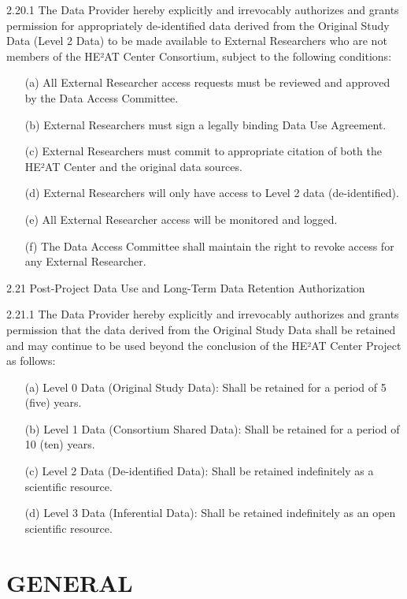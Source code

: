 \documentclass[12pt,letterpaper]{article}
\newcommand{\added}[1]{\textcolor{addcolor}{#1}}
\begin{document}
\added{2.20.1 The Data Provider hereby explicitly and irrevocably authorizes and grants permission for appropriately de-identified data derived from the Original Study Data (Level 2 Data) to be made available to External Researchers who are not members of the HE²AT Center Consortium, subject to the following conditions:
\begin{itemize}
\item[(a)] All External Researcher access requests must be reviewed and approved by the Data Access Committee.
\item[(b)] External Researchers must sign a legally binding Data Use Agreement.
\item[(c)] External Researchers must commit to appropriate citation of both the HE²AT Center and the original data sources.
\item[(d)] External Researchers will only have access to Level 2 data (de-identified).
\item[(e)] All External Researcher access will be monitored and logged.
\item[(f)] The Data Access Committee shall maintain the right to revoke access for any External Researcher.
\end{itemize}}

\added{2.21 Post-Project Data Use and Long-Term Data Retention Authorization}

\added{2.21.1 The Data Provider hereby explicitly and irrevocably authorizes and grants permission that the data derived from the Original Study Data shall be retained and may continue to be used beyond the conclusion of the HE²AT Center Project as follows:
\begin{itemize}
\item[(a)] Level 0 Data (Original Study Data): Shall be retained for a period of 5 (five) years.
\item[(b)] Level 1 Data (Consortium Shared Data): Shall be retained for a period of 10 (ten) years.
\item[(c)] Level 2 Data (De-identified Data): Shall be retained indefinitely as a scientific resource.
\item[(d)] Level 3 Data (Inferential Data): Shall be retained indefinitely as an open scientific resource.
\end{itemize}}

\section{GENERAL}
\end{document}
